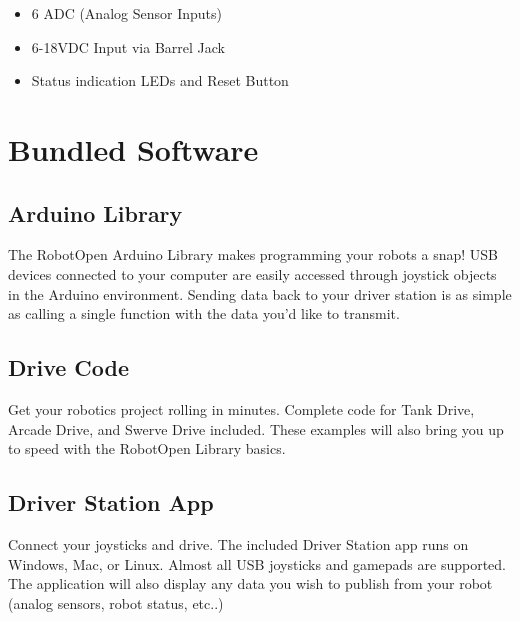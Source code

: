 \documentclass{article}
\begin{document}
\begin{multicols}{2}
\begin{itemize}
\item 6 ADC (Analog Sensor Inputs)

\item 6-18VDC Input via Barrel Jack

\item Status indication LEDs and Reset Button

\end{itemize}

\section*{Bundled Software}

\subsection*{Arduino Library}

The RobotOpen Arduino Library makes programming your robots a snap! USB devices connected to your computer are easily accessed through joystick objects in the Arduino environment. Sending data back to your driver station is as simple as calling a single function with the data you'd like to transmit.

\subsection*{Drive Code}

Get your robotics project rolling in minutes. Complete code for Tank Drive, Arcade Drive, and Swerve Drive included. These examples will also bring you up to speed with the RobotOpen Library basics.

\subsection*{Driver Station App}

Connect your joysticks and drive. The included Driver Station app runs on Windows, Mac, or Linux. Almost all USB joysticks and gamepads are supported. The application will also display any data you wish to publish from your robot (analog sensors, robot status, etc..) 


\end{multicols}
\end{document}
